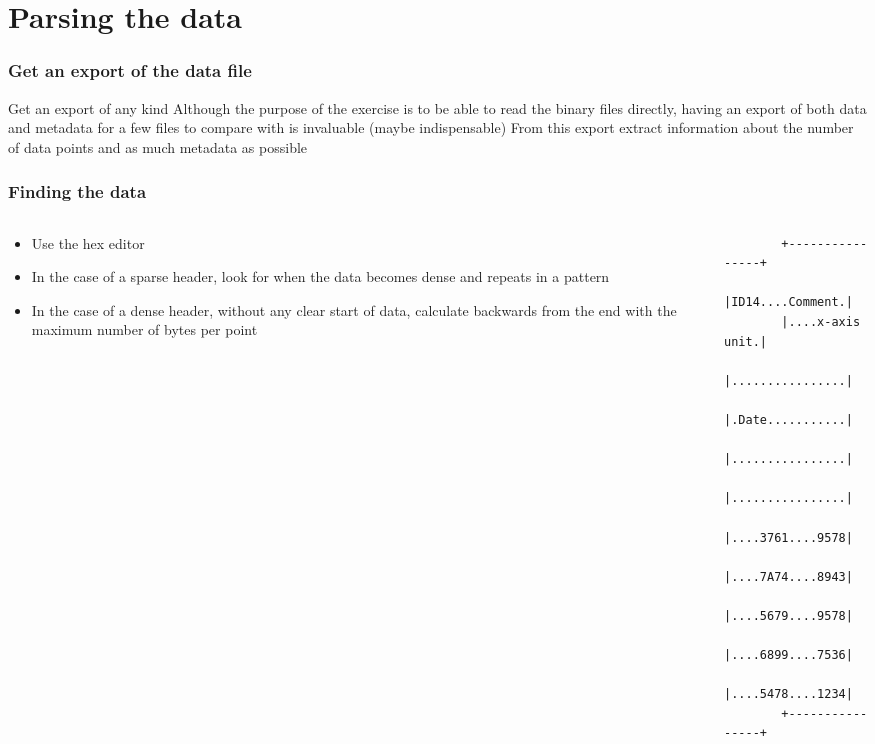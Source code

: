 \documentclass{beamer}
\begin{document}
\section{Parsing the data}

\begin{frame}
  \frametitle{Get an export of the data file}
  \begin{alertblock}{Get an export of any kind}
    Although the purpose of the exercise is to be able to read the
    binary files directly, having an export of both data and metadata
    for a few files to compare with is invaluable (maybe
    indispensable)\newline
    \newline
    From this export extract information about the number of data points
    and as much metadata as possible
  \end{alertblock}
\end{frame}


\begin{frame}[fragile]
  \frametitle{Finding the data}
  \begin{columns}[onlytextwidth]
    \begin{column}{0.5\textwidth}
      \begin{itemize}
      \item Use the hex editor
      \item In the case of a sparse header, look for when the data becomes
        dense and repeats in a pattern
      \item In the case of a dense header, without any clear start of
        data, calculate backwards from the end with the maximum number of
        bytes per point
      \end{itemize}
    \end{column}
    \begin{column}{0.5\textwidth}
      \begin{verbatim}
        +----------------+
        |ID14....Comment.|
        |....x-axis unit.|
        |................|
        |.Date...........|
        |................|
        |................|
        |....3761....9578|
        |....7A74....8943|
        |....5679....9578|
        |....6899....7536|
        |....5478....1234|
        +----------------+
      \end{verbatim}
    \end{column}
  \end{columns}
\end{frame}
\end{document}
